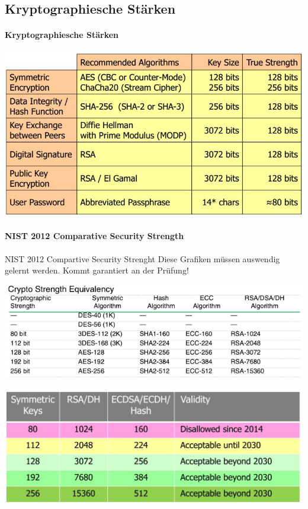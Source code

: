 \subsection{Kryptographiesche Stärken}
\paragraph{Kryptographiesche Stärken} \hfill
\newline
\begin{minipage}[t]{1\textwidth}
    \centering
	\includegraphics[width=0.7\linewidth]{images/cryptographical_strenght}
	\label{fig:cryptographicalstrenght}
\end{minipage}


\paragraph{NIST 2012 Comparative Security Strength} \hfill
\begin{hint}{NIST 2012 Compartive Security Strenght}{}
	Diese Grafiken müssen auswendig gelernt werden. Kommt garantiert an der Prüfung!
\end{hint}


\begin{minipage}[t]{1\textwidth}
    \centering
	\includegraphics[width=0.9\linewidth]{images/crypto-strength-table.png}
    \caption{}
    \label{fig:keystrenghtcomparison}
\end{minipage}

\begin{minipage}[t]{1\textwidth}
    \centering
	\includegraphics[width=0.7\linewidth]{images/key_strenght_comparison}
    \caption{}
    \label{fig:keystrenghtcomparison}
\end{minipage}



